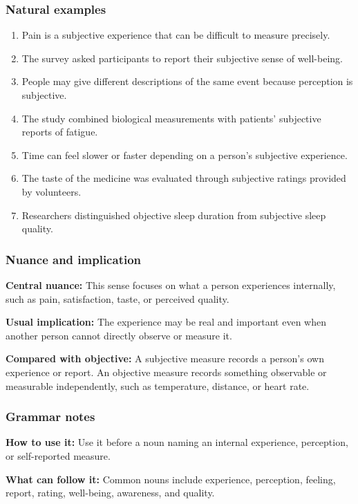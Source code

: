\documentclass[11pt]{article}
\begin{document}
\subsubsection{Natural examples}
\begin{enumerate}
  \item Pain is a subjective experience that can be difficult to measure precisely.
  \item The survey asked participants to report their subjective sense of well-being.
  \item People may give different descriptions of the same event because perception is subjective.
  \item The study combined biological measurements with patients' subjective reports of fatigue.
  \item Time can feel slower or faster depending on a person's subjective experience.
  \item The taste of the medicine was evaluated through subjective ratings provided by volunteers.
  \item Researchers distinguished objective sleep duration from subjective sleep quality.
\end{enumerate}

\subsubsection{Nuance and implication}
\textbf{Central nuance:} This sense focuses on what a person experiences internally, such as pain, satisfaction, taste, or perceived quality.

\textbf{Usual implication:} The experience may be real and important even when another person cannot directly observe or measure it.

\textbf{Compared with objective:} A subjective measure records a person's own experience or report. An objective measure records something observable or measurable independently, such as temperature, distance, or heart rate.

\subsubsection{Grammar notes}
\textbf{How to use it:} Use it before a noun naming an internal experience, perception, or self-reported measure.

\textbf{What can follow it:} Common nouns include experience, perception, feeling, report, rating, well-being, awareness, and quality.
\end{document}
